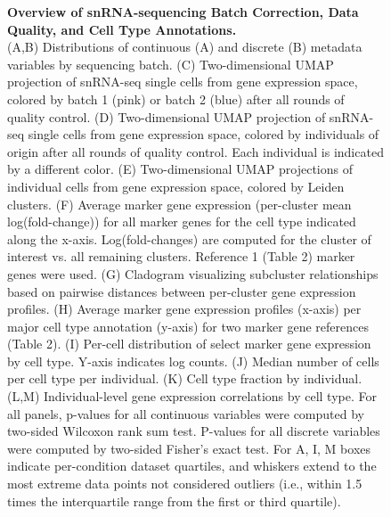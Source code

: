 \begin{figure}[ht]
    \centering
    \caption{
        \textbf{Overview of snRNA-sequencing Batch Correction, Data Quality, and Cell Type Annotations.}\\[1ex]
        (A,B) Distributions of continuous (A) and discrete (B) metadata variables by sequencing batch. 
        (C) Two-dimensional UMAP projection of snRNA-seq single cells from gene expression space, colored by batch 1 (pink) or batch 2 (blue) after all rounds of quality control. 
        (D) Two-dimensional UMAP projection of snRNA-seq single cells from gene expression space, colored by individuals of origin after all rounds of quality control. Each individual is indicated by a different color. 
        (E) Two-dimensional UMAP projections of individual cells from gene expression space, colored by Leiden clusters. 
        (F) Average marker gene expression (per-cluster mean log(fold-change)) for all marker genes for the cell type indicated along the x-axis. Log(fold-changes) are computed for the cluster of interest vs. all remaining clusters. Reference 1 (Table 2) marker genes were used. 
        (G) Cladogram visualizing subcluster relationships based on pairwise distances between per-cluster gene expression profiles. 
        (H) Average marker gene expression profiles (x-axis) per major cell type annotation (y-axis) for two marker gene references (Table 2). (I) Per-cell distribution of select marker gene expression by cell type. Y-axis indicates log counts. 
        (J) Median number of cells per cell type per individual. 
        (K) Cell type fraction by individual. (L,M) Individual-level gene expression correlations by cell type. For all panels, p-values for all continuous variables were computed by two-sided Wilcoxon rank sum test. P-values for all discrete variables were computed by two-sided Fisher’s exact test. For A, I, M boxes indicate per-condition dataset quartiles, and whiskers extend to the most extreme data points not considered outliers (i.e., within 1.5 times the interquartile range from the first or third quartile).
    }
    \label{fig:snRNA_quality_annotation}
\end{figure}

